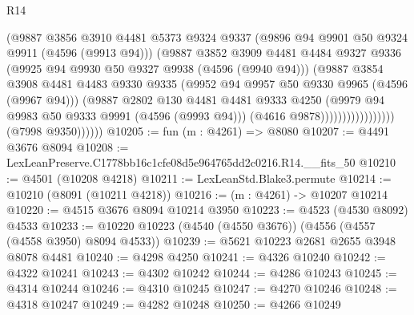 \begin{lexlean}{R14}
\begin{coremodule}
                                      (@9887
                                        @3856
                                        @3910
                                        @4481
                                        @5373
                                        @9324
                                        @9337
                                        (@9896 @94 @9901 @50 @9324 @9911 (@4596 (@9913 @94)))
                                        (@9887
                                          @3852
                                          @3909
                                          @4481
                                          @4484
                                          @9327
                                          @9336
                                          (@9925 @94 @9930 @50 @9327 @9938 (@4596 (@9940 @94)))
                                          (@9887
                                            @3854
                                            @3908
                                            @4481
                                            @4483
                                            @9330
                                            @9335
                                            (@9952 @94 @9957 @50 @9330 @9965 (@4596 (@9967 @94)))
                                            (@9887
                                              @2802
                                              @130
                                              @4481
                                              @4481
                                              @9333
                                              @4250
                                              (@9979 @94 @9983 @50 @9333 @9991 (@4596 (@9993 @94)))
                                              (@4616 @9878)))))))))))))))))
              (@7998 @9350))))))
@10205 := fun (m : @4261) => @8080
@10207 := @4491 @3676 @8094
@10208 := LexLeanPreserve.C1778bb16c1cfe08d5e964765dd2c0216.R14.__fits_50
@10210 := @4501 (@10208 @4218)
@10211 := LexLeanStd.Blake3.permute
@10214 := @10210 (@8091 (@10211 @4218))
@10216 := (m : @4261) -> @10207 @10214
@10220 := @4515 @3676 @8094 @10214 @3950
@10223 := @4523 (@4530 @8092) @4533
@10233 := @10220 @10223 (@4540 (@4550 @3676)) (@4556 (@4557 (@4558 @3950) @8094 @4533))
@10239 := @5621 @10223 @2681 @2655 @3948 @8078 @4481
@10240 := @4298 @4250
@10241 := @4326 @10240
@10242 := @4322 @10241
@10243 := @4302 @10242
@10244 := @4286 @10243
@10245 := @4314 @10244
@10246 := @4310 @10245
@10247 := @4270 @10246
@10248 := @4318 @10247
@10249 := @4282 @10248
@10250 := @4266 @10249

\end{coremodule}
\end{lexlean}
